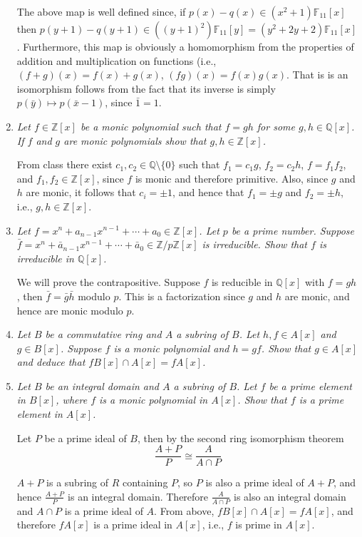 \documentclass[10pt]{article}
\newcommand{\Z}{\mathbb{Z}}
\newcommand{\Q}{\mathbb{Q}}
\newcommand{\F}{\mathbb{F}}
\newcommand{\iso}{\cong}
\begin{document}
\begin{enumerate}
The above map is well defined since, if $p(x) - q(x) \in (x^2+1)\F_{11}[x]$ then $p(y+1) - q(y+1) \in ((y+1)^2)\F_{11}[y] = (y^2+2y+2)\F_{11}[x]$.  Furthermore, this map is obviously a homomorphism from the properties of addition and multiplication on functions (i.e., $(f+g)(x) = f(x) + g(x)$, $(fg)(x) = f(x)g(x)$.  That is is an isomorphism follows from the fact that its inverse is simply $p(\bar{y}) \mapsto p(\bar{x} - 1)$, since $\bar{1} = 1$.

\item \emph{Let $f \in \Z[x]$ be a monic polynomial such that $f = gh$ for some $g,h \in \Q[x]$.  If $f$ and $g$ are monic polynomials show that $g,h \in \Z[x]$.}

From class there exist $c_1, c_2 \in \Q \setminus \{0\}$ such that $f_1 = c_1g$, $f_2 = c_2h$, $f = f_1f_2$, and $f_1,f_2 \in \Z[x]$, since $f$ is monic and therefore primitive.  Also, since $g$ and $h$ are monic, it follows that $c_i = \pm 1$, and hence that $f_1 = \pm g$ and $f_2 = \pm h$, i.e., $g,h \in \Z[x]$.

\item \emph{Let $f = x^n + a_{n-1}x^{n-1} + \cdots + a_0 \in \Z[x]$.  Let $p$ be a prime number.  Suppose $\bar{f} = x^n + \bar{a}_{n-1}x^{n-1} + \cdots + \bar{a}_0 \in \Z/p\Z[x]$ is irreducible.  Show that $f$ is irreducible in $\Q[x]$.}

We will prove the contrapositive.  Suppose $f$ is reducible in $\Q[x]$ with $f=gh$, then $\bar{f} = \bar{g}\bar{h}$ modulo $p$.  This is a factorization since $g$ and $h$ are monic, and hence are monic modulo $p$.

\item \emph{Let $B$ be a commutative ring and $A$ a subring of $B$.  Let $h,f \in A[x]$ and $g \in B[x]$.  Suppose $f$ is a monic polynomial and $h = gf$.  Show that $g \in A[x]$ and deduce that $fB[x] \cap A[x] = fA[x]$.}

\item \emph{Let $B$ be an integral domain and $A$ a subring of $B$.  Let $f$ be a prime element in $B[x]$, where $f$ is a monic polynomial in $A[x]$.  Show that $f$ is a prime element in $A[x]$.}

Let $P$ be a prime ideal of $B$, then by the second ring isomorphism theorem
\[
\frac{A+P}{P} \iso \frac{A}{A \cap P}
\]

$A+P$ is a subring of $R$ containing $P$, so $P$ is also a prime ideal of $A+P$, and hence $\frac{A+P}{P}$ is an integral domain.  Therefore $\frac{A}{A \cap P}$ is also an integral domain and $A \cap P$ is a prime ideal of $A$.  From above, $fB[x] \cap A[x] = f A[x]$, and therefore $f A[x]$ is a prime ideal in $A[x]$, i.e., $f$ is prime in $A[x]$.


\end{enumerate}
\end{document}
